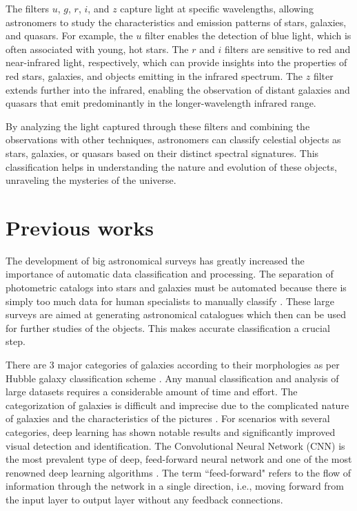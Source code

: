 The filters $u$, $g$, $r$, $i$, and $z$ capture light at specific wavelengths, allowing astronomers to study the characteristics and emission patterns of stars, galaxies, and quasars. For example, the $u$ filter enables the detection of blue light, which is often associated with young, hot stars. The $r$ and $i$ filters are sensitive to red and near-infrared light, respectively, which can provide insights into the properties of red stars, galaxies, and objects emitting in the infrared spectrum. The $z$ filter extends further into the infrared, enabling the observation of distant galaxies and quasars that emit predominantly in the longer-wavelength infrared range.

By analyzing the light captured through these filters and combining the observations with other techniques, astronomers can classify celestial objects as stars, galaxies, or quasars based on their distinct spectral signatures. This classification helps in understanding the nature and evolution of these objects, unraveling the mysteries of the universe.




\section{Previous works}
The development of big astronomical surveys has greatly increased the importance of automatic data classification and processing. The separation of photometric catalogs into stars and galaxies must be automated because there is simply too much data for human specialists to manually classify \citep{Kim2016}. These large surveys are aimed at generating astronomical catalogues which then can be used for further studies of the objects. This makes accurate classification a crucial step.

There are 3 major categories of galaxies according to their morphologies as per Hubble galaxy classification scheme \citep{Hubble}. Any manual classification and analysis of large datasets requires a considerable amount of time and effort. The categorization of galaxies is difficult and imprecise due to the complicated nature of galaxies and the characteristics of the pictures \citep{Khalifa}. For scenarios with several categories, deep learning has shown notable results and significantly improved visual detection and identification.
The Convolutional Neural Network (CNN) is the most prevalent type of deep, feed-forward neural network and one of the most renowned deep learning algorithms \citep{Khalifa}.  The term ``feed-forward" refers to the flow of information through the network in a single direction, i.e., moving forward from the input layer to output layer without any feedback connections.

